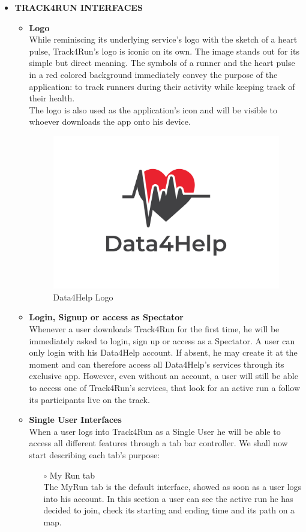 \documentclass[titlepage]{article}
\begin{document}
\begin{itemize}
\begin{itemize}
\begin{itemize}
				\end{itemize}
			\end{itemize}
			\item {\bf TRACK4RUN INTERFACES} \\[1ex]		
			\begin{itemize}
				\item{\bf Logo}\\
			While reminiscing its underlying service’s logo with the sketch of a heart pulse, Track4Run’s logo is iconic on its own. The image stands out for its simple but direct meaning. The symbols of a runner and the heart pulse in a red colored background immediately convey the purpose of the application: to track runners during their activity while keeping track of their health.\\
The logo is also used as the application’s icon and will be visible to whoever downloads the app onto his device.

					\begin{figure}[h]
						\center
  						\includegraphics[width=0.7\columnwidth]{D4HLogo.jpg}
  						\caption{Data4Help Logo}
 						\label{fig:Logo}
					\end{figure}
				\item{\bf Login, Signup or access as Spectator}\\
				Whenever a user downloads Track4Run for the first time, he will be immediately asked to login, sign up or access as a Spectator. A user can only login with his Data4Help account. If absent, he may create it at the moment and can therefore access all Data4Help’s services through its exclusive app. However, even without an account, a user will still be able to access one of Track4Run’s services, that look for an active run a follow its participants live on the track.
				\item{\bf Single User Interfaces}\\
			When a user logs into Track4Run as a Single User he will be able to access all different features through a tab bar controller. We shall now start describing each tab’s purpose:
				\begin{itemize}
					\item[$\circ$] My Run tab \\
					The MyRun tab is the default interface, showed as soon as a user logs into his account. In this section a user can see the active run he has decided to join, check its starting and ending time and its path on a map.\\


\end{itemize}
\end{itemize}
\end{itemize}
\end{document}

